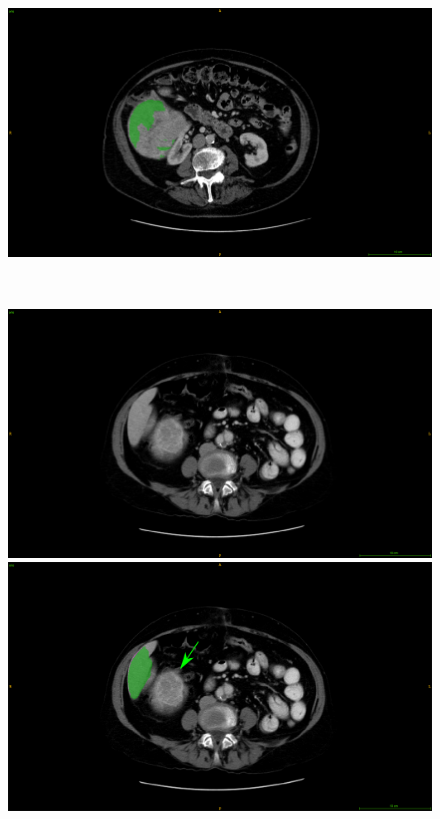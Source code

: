 \documentclass[]{article}
\begin{document}
\begin{figure}[ht!]
\begin{minipage}{0.45\linewidth}
	\end{minipage} \hspace{-0.1cm}
	\begin{minipage}{0.45\linewidth}
		\includegraphics[width=\linewidth]{../Contributions/images/MisSegmentations/ResizeTCGA-DD-A4NK_slice32_liverPrediction_Cmap}
	\end{minipage} \\
	\begin{minipage}{0.45\linewidth}
		\includegraphics[width=\linewidth]{../Contributions/images/MisSegmentations/ResizeTCGA-DD-A1EB_slice9_raw}
	\end{minipage} \hspace{-0.1cm}
	\begin{minipage}{0.45\linewidth}
		\includegraphics[width=\linewidth]{../Contributions/images/MisSegmentations/ResizeTCGA-DD-A1EB_slice9_liverPrediction_Cmap_Arrow}

\end{minipage}
\end{figure}
\end{document}
